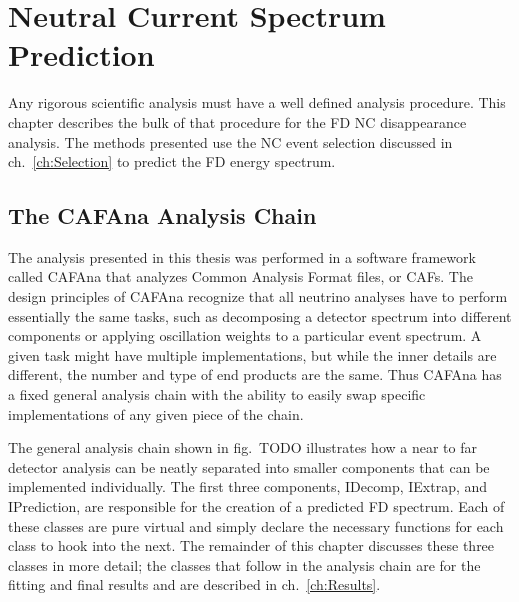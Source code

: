 \chapter{Neutral Current Spectrum Prediction}
\label{ch:Prediction}

Any rigorous scientific analysis must have a well defined analysis procedure. This chapter describes the bulk of that procedure for the FD NC disappearance analysis. The methods presented use the NC event selection discussed in ch.~\ref{ch:Selection} to predict the FD energy spectrum.

\section{The CAFAna Analysis Chain}

The analysis presented in this thesis was performed in a software framework called CAFAna that analyzes Common Analysis Format files, or CAFs. The design principles of CAFAna recognize that all neutrino analyses have to perform essentially the same tasks, such as decomposing a detector spectrum into different components or applying oscillation weights to a particular event spectrum. A given task might have multiple implementations, but while the inner details are different, the number and type of end products are the same. Thus CAFAna has a fixed general analysis chain with the ability to easily swap specific implementations of any given piece of the chain.

The general analysis chain shown in fig.~TODO illustrates how a near to far detector analysis can be neatly separated into smaller components that can be implemented individually. The first three components, IDecomp, IExtrap, and IPrediction, are responsible for the creation of a predicted FD spectrum. Each of these classes are pure virtual and simply declare the necessary functions for each class to hook into the next. The remainder of this chapter discusses these three classes in more detail; the classes that follow in the analysis chain are for the fitting and final results and are described in ch.~\ref{ch:Results}.

